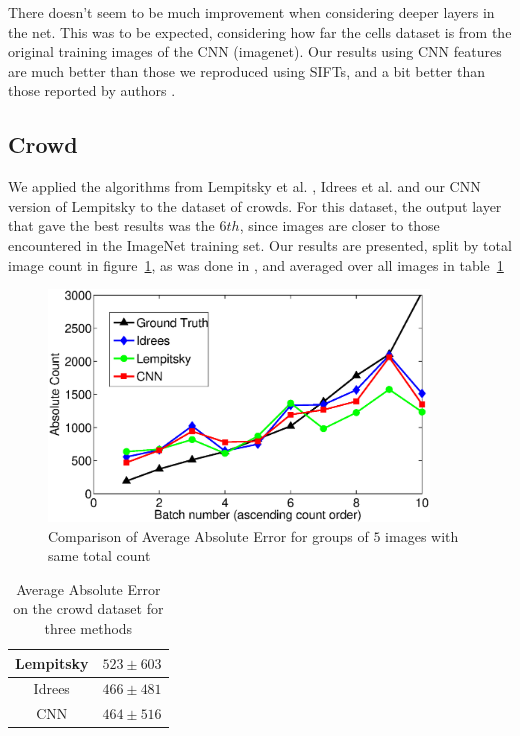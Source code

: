 \documentclass[a4paper,11pt, french]{article}
\begin{document}
There doesn't seem to be much improvement when considering deeper layers in the net. This was to be expected, considering how far the cells dataset is from the original training images of the CNN (imagenet).
Our results using CNN features are much better than those we reproduced using SIFTs, and a bit better than those reported by authors \cite{basepaper}.

\subsection*{Crowd}

We applied the algorithms from Lempitsky et al. \cite{basepaper} , Idrees et al. \cite{multisource} and our CNN version of Lempitsky to the dataset of crowds. For this dataset, the output layer that gave the best results was the $6th$, since images are closer to those encountered in the ImageNet training set. Our results are presented, split by total image count in figure~\ref{fig_compare}, as was done in \cite{multisource}, and averaged over all images in table~\ref{adcrowd}

\begin{figure}[H]
  \centering
  \includegraphics[width=0.9\textwidth]{figures/good_compare.eps}
  \caption{Comparison of Average Absolute Error for groups of $5$ images with same total count}
  \label{fig_compare}
\end{figure}

\begin{table}[H]
 \centering
  \begin{tabular}{|c|c|}
    \hline
    Lempitsky & $523 \pm 603$  \\ \hline
    Idrees & $466 \pm 481$  \\ \hline
    CNN & $464 \pm 516$  \\ \hline
  \end{tabular}
  
  \caption{Average Absolute Error on the crowd dataset for three methods}
  \label{adcrowd}
\end{table}
\end{document}
